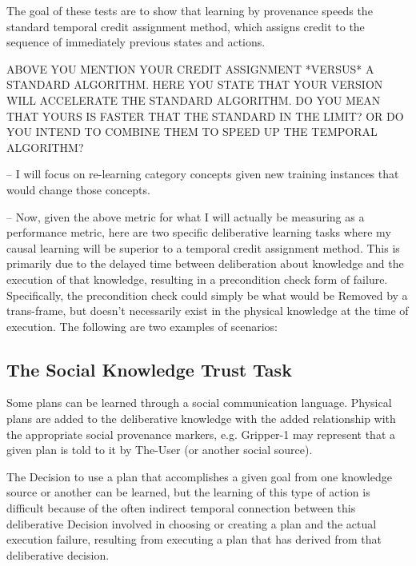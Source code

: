         The goal of these tests are to show that learning by
        provenance speeds the standard temporal credit assignment
        method, which assigns credit to the sequence of immediately
        previous states and actions.

ABOVE YOU MENTION YOUR CREDIT ASSIGNMENT *VERSUS* A STANDARD ALGORITHM. HERE YOU STATE THAT YOUR VERSION WILL ACCELERATE THE STANDARD ALGORITHM. DO YOU MEAN THAT YOURS IS FASTER THAT THE STANDARD IN THE LIMIT? OR DO YOU INTEND TO COMBINE THEM TO SPEED UP THE TEMPORAL ALGORITHM? 

     -- I will focus on re-learning category concepts given new
        training instances that would change those concepts.

  -- Now, given the above metric for what I will actually be measuring
     as a performance metric, here are two specific deliberative
     learning tasks where my causal learning will be superior to a
     temporal credit assignment method.  This is primarily due to the
     delayed time between deliberation about knowledge and the
     execution of that knowledge, resulting in a precondition check
     form of failure.  Specifically, the precondition check could
     simply be what would be Removed by a trans-frame, but doesn't
     necessarily exist in the physical knowledge at the time of
     execution.  The following are two examples of scenarios:

\subsection{The Social Knowledge Trust Task}

        Some plans can be learned through a social communication
        language.  Physical plans are added to the deliberative
        knowledge with the added relationship with the appropriate
        social provenance markers, e.g. Gripper-1 may represent that a
        given plan is told to it by The-User (or another social
        source).

        The Decision to use a plan that accomplishes a given goal from
        one knowledge source or another can be learned, but the
        learning of this type of action is difficult because of the
        often indirect temporal connection between this deliberative
        Decision involved in choosing or creating a plan and the
        actual execution failure, resulting from executing a plan that
        has derived from that deliberative decision.

